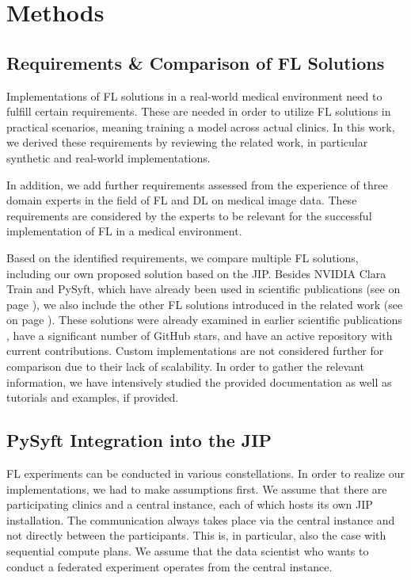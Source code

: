 \section{Methods}
\label{sec:Methods}

\subsection{Requirements \& Comparison of FL Solutions}
\label{subsec:MethodsRequirements}

Implementations of FL solutions in a real-world medical environment need to fulfill certain requirements. These are needed in order to utilize FL solutions in practical scenarios, meaning training a model across actual clinics. In this work, we derived these requirements by reviewing the related work, in particular synthetic and real-world implementations.

In addition, we add further requirements assessed from the experience of three domain experts in the field of FL and DL on medical image data. These requirements are considered by the experts to be relevant for the successful implementation of FL in a medical environment.

Based on the identified requirements, we compare multiple FL solutions, including our own proposed solution based on the JIP. Besides NVIDIA Clara Train and PySyft, which have already been used in scientific publications (see  on page \pageref{subsec:LitRev}), we also include the other FL solutions introduced in the related work (see  on page \pageref{subsec:SolutionsFL}). These solutions were already examined in earlier scientific publications \citep{Li2019AProtection, He2020FedML:Learning}, have a significant number of GitHub stars, and have an active repository with current contributions. Custom implementations are not considered further for comparison due to their lack of scalability. In order to gather the relevant information, we have intensively studied the provided documentation as well as tutorials and examples, if provided.



\subsection{PySyft Integration into the JIP}
\label{subsec:MethodsPySyftIntegration}
FL experiments can be conducted in various constellations. In order to realize our implementations, we had to make assumptions first.
We assume that there are participating clinics and a central instance, each of which hosts its own JIP installation. The communication always takes place via the central instance and not directly between the participants. This is, in particular, also the case with sequential compute plans.
We assume that the data scientist who wants to conduct a federated experiment operates from the central instance.

